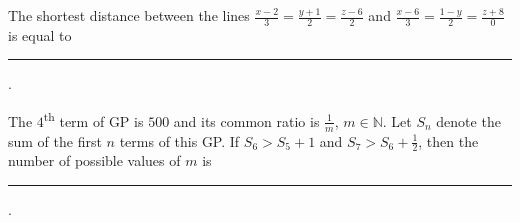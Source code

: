 \hfill{}

\item The shortest distance between the lines $\frac{x-2}{3}=\frac{y+1}{2}=\frac{z-6}{2}$ and $\frac{x-6}{3}=\frac{1-y}{2}=\frac{z+8}{0}$ is equal to \rule{1cm}{0.15mm}.

\hfill{}

\item The $4$\textsuperscript{th} term of GP is $500$ and its common ratio is $\frac{1}{m}$, $m\in \mathbb{N}$. Let $S_n$ denote the sum of the first $n$ terms of this GP. If $S_6>S_5+1$ and $S_7>S_6+\frac{1}{2}$, then the number of possible values of $m$ is \rule{1cm}{0.15mm}.

\hfill{}
